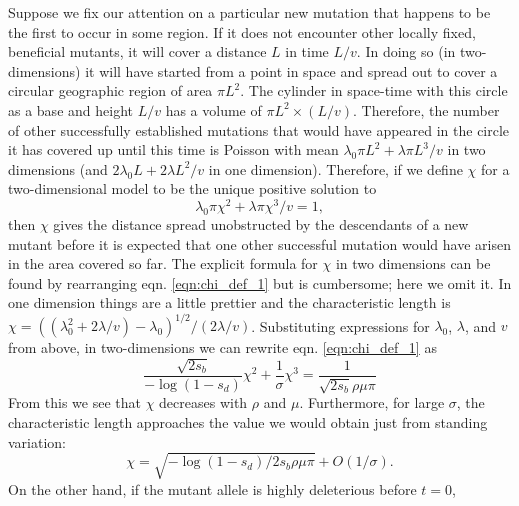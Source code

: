 \documentclass{article}
\begin{document}
Suppose we fix our attention on a particular new mutation that happens to be the first to occur in some region.
If it does not encounter other locally fixed, beneficial mutants,
it will cover a distance $L$ in time $L/v$. In doing so (in two-dimensions) it will have
started from a point in space and spread out to cover a circular geographic region of area $\pi L^2$.
The cylinder in space-time with this circle as a base and
height $L/v$ has a volume of $\pi L^2 \times (L/v)$.
Therefore, the number of other successfully established mutations that
would have appeared in the circle it has covered up until this time is Poisson with mean
$\lambda_0 \pi L^2 + \lambda \pi L^3 /v$ in two dimensions
(and $2 \lambda_0 L + 2 \lambda L^2 /v$ in one dimension).
Therefore, if we define $\chi$ for a two-dimensional model to be the unique positive solution to
\begin{equation} \label{eqn:chi_def_1}
    \lambda_0 \pi \chi^2 + \lambda \pi \chi^3 /v = 1,
\end{equation}
then $\chi$ gives the distance spread unobstructed by the descendants of a new mutant
before it is expected that one other successful mutation would have arisen in the area covered so far.
The explicit formula for $\chi$ in two dimensions can be found by
rearranging eqn. \eqref{eqn:chi_def_1} but is cumbersome; here we omit
it. In one dimension things are a little prettier and the
characteristic length is $\chi = ( \left(\lambda_0^2 + 2 \lambda/v \right) - \lambda_0 )^{1/2}/( 2 \lambda / v )$.
Substituting expressions for $\lambda_0$, $\lambda$, and $v$ from above,
in two-dimensions we can rewrite eqn. \eqref{eqn:chi_def_1} as
\begin{equation} \label{eqn:defines_chi}
   \frac{\sqrt{2s_b} }{-\log(1-s_d) } \chi^2 + \frac{1}{\sigma} \chi^3 = \frac{1}{\sqrt{2s_b} \rho\mu\pi}
\end{equation}
From this we see that $\chi$ decreases with $\rho$ and $\mu$.
Furthermore, for large $\sigma$, the characteristic length approaches
the value we would obtain just from standing variation:
\begin{equation} \label{eqn:chi_standing}
\chi = \sqrt{ -\log(1-s_d) / 2 s_b \rho \mu \pi } + O(1/\sigma).
\end{equation}
On the other hand, if the mutant allele is highly deleterious before $t=0$,
\end{document}
